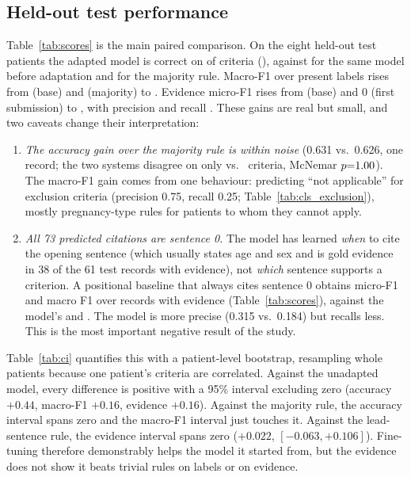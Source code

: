 \subsection{Held-out test performance}
Table~\ref{tab:scores} is the main paired comparison. On the eight held-out test patients the adapted model is correct on \TestCorrect{} of \TestN{} criteria (\TestFtAccPct), against \TestBaseAccPct{} for the same model before adaptation and \TestMajAccPct{} for the majority rule. Macro-F1 over present labels rises from \TestBaseMFp{} (base) and \TestMajMFp{} (majority) to \TestFtMFp. Evidence micro-F1 rises from \TestBaseEvF{} (base) and 0 (first submission) to \TestFtEvF{}, with precision \TestFtEvP{} and recall \TestFtEvR. These gains are real but small, and two caveats change their interpretation:
\begin{enumerate}
\item \emph{The accuracy gain over the majority rule is within noise} (0.631 vs.\ 0.626, one record; the two systems disagree on only \McnemarA{} vs.\ \McnemarM{} criteria, McNemar $p{=}1.00$). The macro-F1 gain comes from one behaviour: predicting ``not applicable'' for exclusion criteria (precision 0.75, recall 0.25; Table~\ref{tab:cls_exclusion}), mostly pregnancy-type rules for patients to whom they cannot apply.
\item \emph{All 73 predicted citations are sentence 0.} The model has learned \emph{when} to cite the opening sentence (which usually states age and sex and is gold evidence in 38 of the 61 test records with evidence), not \emph{which} sentence supports a criterion. A positional baseline that always cites sentence 0 obtains micro-F1 \TestLeadEvF{} and macro F1 over records with evidence \TestLeadEvMp{} (Table~\ref{tab:scores}), against the model's \TestFtEvF{} and \TestFtEvMp. The model is more precise (0.315 vs.\ 0.184) but recalls less. This is the most important negative result of the study.
\end{enumerate}
Table~\ref{tab:ci} quantifies this with a patient-level bootstrap, resampling whole patients because one patient's criteria are correlated. Against the unadapted model, every difference is positive with a 95\% interval excluding zero (accuracy $+0.44$, macro-F1 $+0.16$, evidence $+0.16$). Against the majority rule, the accuracy interval spans zero and the macro-F1 interval just touches it. Against the lead-sentence rule, the evidence interval spans zero ($+0.022$, $[-0.063,+0.106]$). Fine-tuning therefore demonstrably helps the model it started from, but the evidence does not show it beats trivial rules on labels or on evidence.

